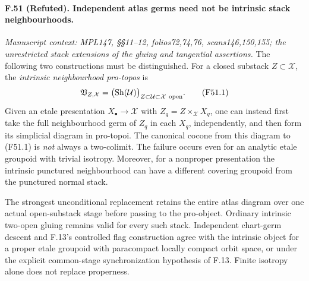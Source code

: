 \paragraph{F.51 (Refuted). Independent atlas germs need not be intrinsic stack neighbourhoods.}
\textit{Manuscript context: MPL147, \S\S11--12, folios72,74,76,
scans146,150,155; the unrestricted stack extensions of the gluing and
tangential assertions.}
The following two constructions must be distinguished. For a closed
substack $Z\subset\mathcal X$, the \emph{intrinsic neighbourhood
pro-topos} is
\[
 \mathfrak V_{Z,\mathcal X}
   =\bigl(\operatorname{Sh}(\mathcal U)\bigr)_{
           Z\subset\mathcal U\subset\mathcal X\ {\rm open}}.
                                                        \tag{F51.1}
\]
Given an etale presentation $X_\bullet\to\mathcal X$ with
$Z_q=Z\times_{\mathcal X}X_q$, one can instead first take the full
neighbourhood germ of $Z_q$ in each $X_q$, independently, and then
form its simplicial diagram in pro-topoi. The canonical cocone from
this diagram to (F51.1) is \emph{not} always a two-colimit. The
failure occurs even for an analytic etale groupoid with trivial
isotropy. Moreover, for a nonproper presentation the intrinsic
punctured neighbourhood can have a different covering groupoid from
the punctured normal stack.

The strongest unconditional replacement retains the entire atlas
diagram over one actual open-substack stage before passing to the
pro-object. Ordinary intrinsic two-open gluing remains valid for
every such stack. Independent chart-germ descent and F.13's controlled
flag construction agree with the intrinsic object for a proper
etale groupoid with paracompact locally compact orbit space, or under
the explicit common-stage synchronization hypothesis of F.13.
Finite isotropy alone does not replace properness.

